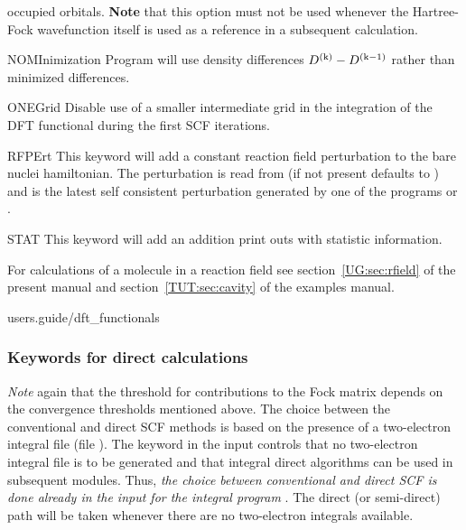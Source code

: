 \begin{keywordlist}
occupied orbitals.
{\bf Note} that this option must not be used whenever the Hartree-Fock
wavefunction itself is used as a reference in a subsequent calculation.
\item[NOMInimization]
Program will use density differences
$D^{\rm(k)}-D^{\rm(k-1)}$
rather than minimized differences.
\item[ONEGrid]
Disable use of a smaller intermediate grid in the integration of the
DFT functional during the first SCF iterations.
\item[RFPErt]
This keyword will add a constant reaction field perturbation to the
bare nuclei hamiltonian.
The perturbation is read from  (if not present defaults to ) and
is the latest self consistent perturbation generated
by one of the programs  or .
\item[STAT]
This keyword will add an addition print outs with statistic information.

\end{keywordlist}

For calculations of a molecule in a reaction field see section~\ref{UG:sec:rfield}
of the present manual and section~\ref{TUT:sec:cavity} of the examples manual.

 {users.guide/dft_functionals}


\subsubsection{Keywords for direct calculations}
{\em Note} again that the threshold for contributions to
the Fock matrix depends on the convergence thresholds
mentioned above. The choice between the conventional and direct SCF
methods is based on the presence of a two-{}electron integral file
(file ). The keyword
 in the  input controls that no
two-{}electron integral file is to be generated and that integral direct
algorithms can be used in subsequent modules. Thus, {\em the
choice between conventional and direct SCF is done already in the input
for the integral program }. The direct (or semi-direct)
path will be taken whenever there are no two-{}electron integrals available.

